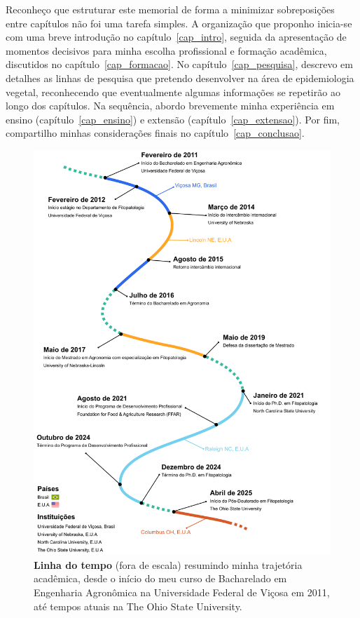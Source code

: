 \documentclass[12pt,a4paper,oneside]{book}
\newcommand{\UFV}{Universidade Federal de Viçosa}
\newcommand{\OSU}{The Ohio State University}
\begin{document}
Reconheço que estruturar este memorial de forma a minimizar sobreposições entre capítulos não foi uma tarefa 
simples. A organização que proponho inicia-se com uma breve introdução no capítulo~\ref{cap_intro}, seguida 
da apresentação de momentos decisivos para minha escolha profissional e formação acadêmica, discutidos no 
capítulo~\ref{cap_formacao}. No capítulo~\ref{cap_pesquisa}, descrevo em detalhes as linhas de pesquisa 
que pretendo desenvolver na área de epidemiologia vegetal, reconhecendo que eventualmente algumas informações 
se repetirão ao longo dos capítulos. Na sequência, abordo brevemente minha experiência em 
ensino (capítulo~\ref{cap_ensino}) e extensão (capítulo~\ref{cap_extensao}). Por fim, compartilho 
minhas considerações finais no capítulo~\ref{cap_conclusao}.


\begin{figure}[tb]
  \begin{center}
    \includegraphics[width=\textwidth,height=0.8\textheight,keepaspectratio]{images/timeline.pdf}
  \end{center}
  \caption*{
    \textbf{Linha do tempo} (fora de escala) resumindo minha trajetória
    acadêmica, desde o início do meu curso de Bacharelado em Engenharia Agronômica na
    \UFV{} em 2011, até tempos atuais na \OSU{}.
  }
\end{figure}
\end{document}
